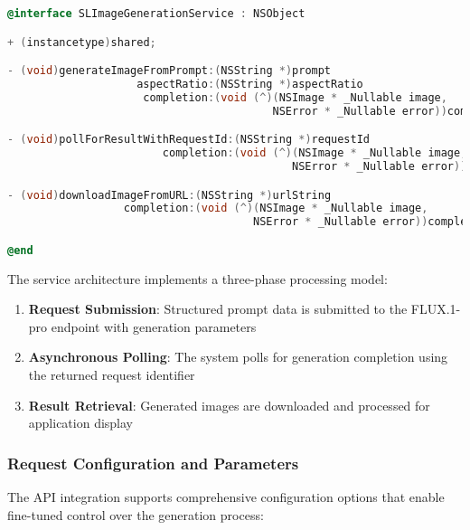 \begin{lstlisting}[language=C,basicstyle=\footnotesize\ttfamily,frame=single,breaklines=true,columns=flexible,caption={FLUX API Service Implementation},label={lst:flux_api_service}]
@interface SLImageGenerationService : NSObject

+ (instancetype)shared;

- (void)generateImageFromPrompt:(NSString *)prompt
                    aspectRatio:(NSString *)aspectRatio
                     completion:(void (^)(NSImage * _Nullable image, 
                                         NSError * _Nullable error))completion;

- (void)pollForResultWithRequestId:(NSString *)requestId
                        completion:(void (^)(NSImage * _Nullable image, 
                                            NSError * _Nullable error))completion;

- (void)downloadImageFromURL:(NSString *)urlString
                  completion:(void (^)(NSImage * _Nullable image, 
                                      NSError * _Nullable error))completion;

@end
\end{lstlisting}

The service architecture implements a three-phase processing model:

\begin{enumerate}
    \item \textbf{Request Submission}: Structured prompt data is submitted to the FLUX.1-pro endpoint with generation parameters
    \item \textbf{Asynchronous Polling}: The system polls for generation completion using the returned request identifier
    \item \textbf{Result Retrieval}: Generated images are downloaded and processed for application display
\end{enumerate}

\subsubsection{Request Configuration and Parameters}

The API integration supports comprehensive configuration options that enable fine-tuned control over the generation process:

